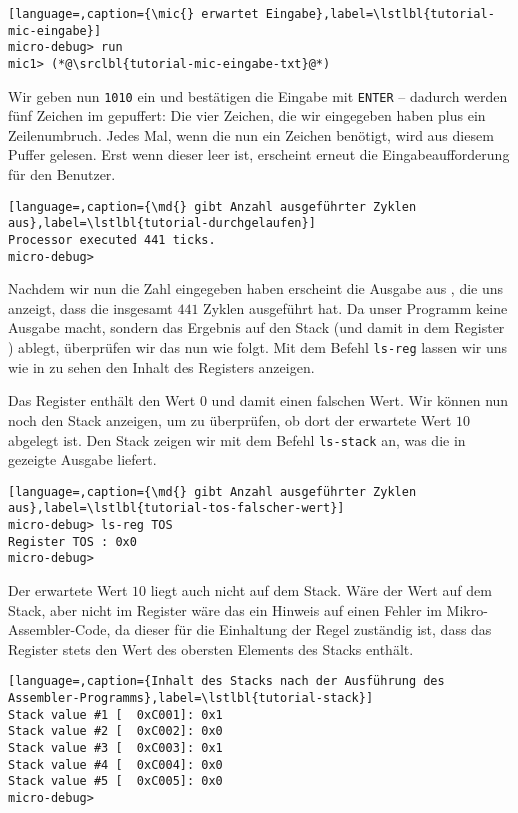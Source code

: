 \begin{lstlisting}[language=,caption={\mic{} erwartet Eingabe},label=\lstlbl{tutorial-mic-eingabe}]
micro-debug> run
mic1> (*@\srclbl{tutorial-mic-eingabe-txt}@*)
\end{lstlisting}

Wir geben nun \texttt{1010} ein und bestätigen die Eingabe mit \texttt{ENTER} -- dadurch werden fünf Zeichen im \md{} gepuffert: Die vier Zeichen, die wir eingegeben haben plus ein Zeilenumbruch. Jedes Mal, wenn die \mic{} nun ein Zeichen benötigt, wird aus diesem Puffer gelesen. Erst wenn dieser leer ist, erscheint erneut die Eingabeaufforderung für den Benutzer.

\begin{lstlisting}[language=,caption={\md{} gibt Anzahl ausgeführter Zyklen aus},label=\lstlbl{tutorial-durchgelaufen}]
Processor executed 441 ticks.
micro-debug> 
\end{lstlisting}

Nachdem wir nun die Zahl eingegeben haben erscheint die Ausgabe aus , die uns anzeigt, dass die \mic{} insgesamt $441$ Zyklen ausgeführt hat. Da unser Programm keine Ausgabe macht, sondern das Ergebnis auf den Stack (und damit in dem Register ) ablegt, überprüfen wir das nun wie folgt. Mit dem Befehl \texttt{ls-reg} lassen wir uns wie in  zu sehen den Inhalt des Registers  anzeigen.

Das Register  enthält den Wert $0$ und damit einen falschen Wert. Wir können nun noch den Stack anzeigen, um zu überprüfen, ob dort der erwartete Wert $10$ abgelegt ist. Den Stack zeigen wir mit dem Befehl \texttt{ls-stack} an, was die in  gezeigte Ausgabe liefert.

\begin{lstlisting}[language=,caption={\md{} gibt Anzahl ausgeführter Zyklen aus},label=\lstlbl{tutorial-tos-falscher-wert}]
micro-debug> ls-reg TOS
Register TOS : 0x0
micro-debug> 
\end{lstlisting}

Der erwartete Wert $10$ liegt auch nicht auf dem Stack. Wäre der Wert auf dem Stack, aber nicht im Register  wäre das ein Hinweis auf einen Fehler im Mikro-Assembler-Code, da dieser für die Einhaltung der Regel zuständig ist, dass das Register  stets den Wert des obersten Elements des Stacks enthält.

\begin{lstlisting}[language=,caption={Inhalt des Stacks nach der Ausführung des Assembler-Programms},label=\lstlbl{tutorial-stack}]
Stack value #1 [  0xC001]: 0x1
Stack value #2 [  0xC002]: 0x0
Stack value #3 [  0xC003]: 0x1
Stack value #4 [  0xC004]: 0x0
Stack value #5 [  0xC005]: 0x0
micro-debug> 
\end{lstlisting}

